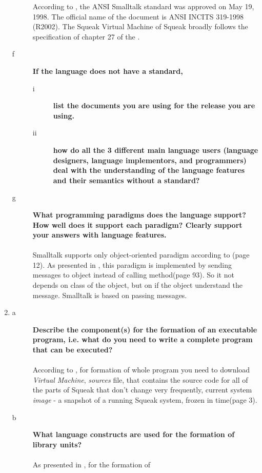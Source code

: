 \documentclass[5pt]{article}
\begin{document}
\begin{enumerate}
\begin{description}
  According to \cite{web:squeak}, the ANSI Smalltalk standard was approved on
  May 19, 1998. The official name of the document is ANSI INCITS 319-1998 (R2002). The Squeak
  Virtual Machine of Squeak broadly follows the specification of chapter 27 of
  the \cite{goldberg:blue_book}.
  \item[f]\textbf{If the language does not have a standard,}
  \begin{description}
  \item[i]\textbf{list the documents you are using for the release you are
  using.}
  \item[ii]\textbf{how do all the 3 different main language users (language
  designers, language implementors, and programmers) deal with the understanding
  of the language features and their semantics without a standard?}
  \end{description}
  \item[g]\textbf{What programming paradigms does the language support? How well
  does it support each paradigm? Clearly support your answers with language
  features.}\\
  \\
  Smalltalk supports only object-oriented paradigm according to
  \cite{goldberg:blue_book}(page 12). As presented in
  \cite{black:squeak_by_example}, this paradigm is implemented by sending
  messages to object instead of calling method(page 93). So it not depends on
  class of the object, but on if the object understand the message. Smalltalk is
  based on passing messages.
  \end{description}
  \item
  \begin{description}
  \item[a]\textbf{Describe the component(s) for the formation of an executable
  program, i.e. what do you need to write a complete program that can be
  executed?}\\
\\
According to \cite{black:squeak_by_example}, for formation of whole program you
need to download \textit{Virtual Machine}, \textit{sources} file, that contains the source code for all of the parts of
Squeak that don’t change very frequently, current system \textit{image} - a snapshot of a running Squeak system,
frozen in time(page 3).
  \item[b]\textbf{What language constructs are used for the formation of library
  units?}\\
  \\
   As presented in \cite{black:squeak_by_example}, for the formation of

\end{description}
\end{enumerate}
\end{document}
